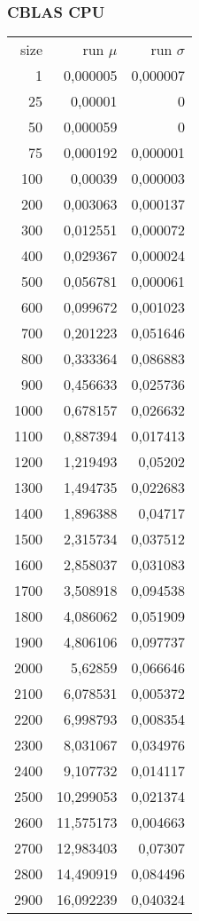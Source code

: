 \subsubsection{CBLAS CPU}

\begin{tabular}{r r r}
size & run $\mu$ & run $\sigma$ \\
1 & 0,000005 & 0,000007 \\
25 & 0,00001 & 0 \\
50 & 0,000059 & 0 \\
75 & 0,000192 & 0,000001 \\
100 & 0,00039 & 0,000003 \\
200 & 0,003063 & 0,000137 \\
300 & 0,012551 & 0,000072 \\
400 & 0,029367 & 0,000024 \\
500 & 0,056781 & 0,000061 \\
600 & 0,099672 & 0,001023 \\
700 & 0,201223 & 0,051646 \\
800 & 0,333364 & 0,086883 \\
900 & 0,456633 & 0,025736 \\
1000 & 0,678157 & 0,026632 \\
1100 & 0,887394 & 0,017413 \\
1200 & 1,219493 & 0,05202 \\
1300 & 1,494735 & 0,022683 \\
1400 & 1,896388 & 0,04717 \\
1500 & 2,315734 & 0,037512 \\
1600 & 2,858037 & 0,031083 \\
1700 & 3,508918 & 0,094538 \\
1800 & 4,086062 & 0,051909 \\
1900 & 4,806106 & 0,097737 \\
2000 & 5,62859 & 0,066646 \\
2100 & 6,078531 & 0,005372 \\
2200 & 6,998793 & 0,008354 \\
2300 & 8,031067 & 0,034976 \\
2400 & 9,107732 & 0,014117 \\
2500 & 10,299053 & 0,021374 \\
2600 & 11,575173 & 0,004663 \\
2700 & 12,983403 & 0,07307 \\
2800 & 14,490919 & 0,084496 \\
2900 & 16,092239 & 0,040324 \\

\end{tabular}
